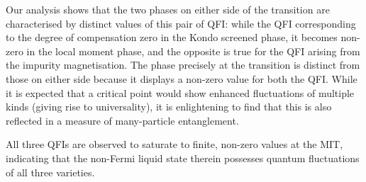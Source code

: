 \documentclass{iopart}
\begin{document}
Our analysis shows that the two phases on either side of the transition are characterised by distinct values of this pair of QFI: while the QFI corresponding to the degree of compensation zero in the Kondo screened phase, it becomes non-zero in the local moment phase, and the opposite is true for the QFI arising from the impurity magnetisation.
The phase precisely at the transition is distinct from those on either side because it displays a non-zero value for both the QFI.
While it is expected that a critical point would show enhanced fluctuations of multiple kinds (giving rise to universality), it is enlightening to find that this is also reflected in a measure of many-particle entanglement.

All three QFIs are observed to saturate to finite, non-zero values at the MIT, indicating that the non-Fermi liquid state therein possesses quantum fluctuations of all three varieties. 
\end{document}
